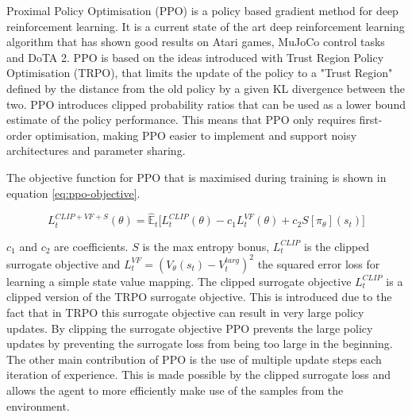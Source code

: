 \documentclass[conference]{IEEEtran}
\newcommand\REVIEW[1]{{\color{blue} #1}}
\begin{document}
Proximal Policy Optimisation (PPO) is a policy based gradient method for deep reinforcement learning. It is a current state of the art deep reinforcement learning algorithm that has shown good results on Atari games, MuJoCo control tasks\cite{schulman2017proximal} and DoTA 2\cite{OpenAI_dota}. PPO is based on the ideas introduced with Trust Region Policy Optimisation (TRPO)\cite{schulman2015trust}, that limits the update of the policy to a "Trust Region" defined by the distance from the old policy by a given KL divergence between the two. PPO introduces clipped probability ratios that can be used as a lower bound estimate of the policy performance. This means that PPO only requires first-order optimisation, making PPO easier to implement and support noisy architectures and parameter sharing.


The objective function for PPO \REVIEW{that is maximised during training} is shown in equation \ref{eq:ppo-objective}.

\begin{equation}
    L_t^{CLIP+VF+S}(\theta) = \hat{\mathbb{E}}_t\big[L_t^{CLIP}(\theta)-c_1L_t^{VF}(\theta)+c_2S[\pi_{\theta}](s_t)\big]
    \label{eq:ppo-objective}
\end{equation}

$c_1$ and $c_2$ are coefficients. $S$ is the max entropy bonus, $L_t^{CLIP}$ is the clipped surrogate objective and $L_t^{VF} = (V_{\theta}(s_t)-V_t^{targ})^2$ the squared error loss for learning a simple state value mapping. \REVIEW{The clipped surrogate objective $L_t^{CLIP}$ is a clipped version of the TRPO surrogate objective. This is introduced due to the fact that in TRPO this surrogate objective can result in very large policy updates. By clipping the surrogate objective PPO prevents the large policy updates by preventing the surrogate loss from being too large in the beginning. The other main contribution of PPO is the use of multiple update steps each iteration of experience. This is made possible by the clipped surrogate loss and allows the agent to more efficiently make use of the samples from the environment.}
\end{document}
